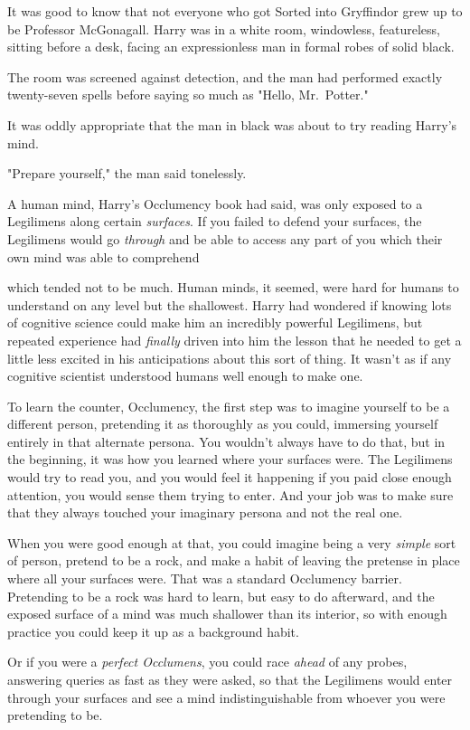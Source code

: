 It was good to know that not everyone who got Sorted into Gryffindor grew up to
be Professor McGonagall.
\sbreak
Harry was in a white room, windowless, featureless, sitting before a desk,
facing an expressionless man in formal robes of solid black.

The room was screened against detection, and the man had performed exactly
twenty-seven spells before saying so much as "Hello, Mr.~Potter."

It was oddly appropriate that the man in black was about to try reading Harry's
mind.

"Prepare yourself," the man said tonelessly.

A human mind, Harry's Occlumency book had said, was only exposed to a
Legilimens along certain \emph{surfaces}. If you failed to defend your
surfaces, the Legilimens would go \emph{through} and be able to access any part
of you which their own mind was able to comprehend{\el}

{\el} which tended not to be much. Human minds, it seemed, were hard for
humans to understand on any level but the shallowest. Harry had wondered if
knowing lots of cognitive science could make him an incredibly powerful
Legilimens, but repeated experience had \emph{finally} driven into him the
lesson that he needed to get a little less excited in his anticipations about
this sort of thing. It wasn't as if any cognitive scientist understood humans
well enough to make one.

To learn the counter, Occlumency, the first step was to imagine yourself to be
a different person, pretending it as thoroughly as you could, immersing
yourself entirely in that alternate persona. You wouldn't always have to do
that, but in the beginning, it was how you learned where your surfaces were.
The Legilimens would try to read you, and you would feel it happening if you
paid close enough attention, you would sense them trying to enter. And your job
was to make sure that they always touched your imaginary persona and not the
real one.

When you were good enough at that, you could imagine being a very \emph{simple}
sort of person, pretend to be a rock, and make a habit of leaving the pretense
in place where all your surfaces were. That was a standard Occlumency barrier.
Pretending to be a rock was hard to learn, but easy to do afterward, and the
exposed surface of a mind was much shallower than its interior, so with enough
practice you could keep it up as a background habit.

Or if you were a \emph{perfect Occlumens}, you could race \emph{ahead} of any
probes, answering queries as fast as they were asked, so that the Legilimens
would enter through your surfaces and see a mind indistinguishable from whoever
you were pretending to be.

